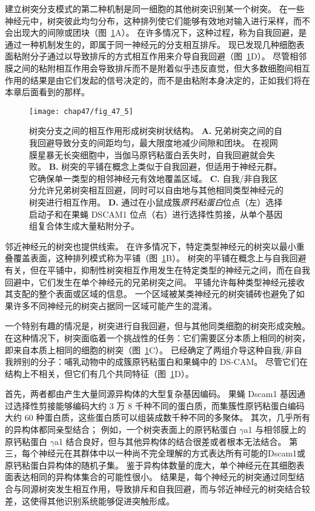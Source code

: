 建立树突分支模式的第二种机制是同一细胞的其他树突识别某一个树突。
在一些神经元中，树突彼此均匀分布，这种排列使它们能够有效地对输入进行采样，而不会出现大的间隙或团块（图~\ref{fig:47_5}A）。
在许多情况下，这种过程，称为自我回避，是通过一种机制发生的，即属于同一神经元的分支相互排斥。
现已发现几种细胞表面粘附分子通过以导致排斥的方式相互作用来介导自我回避（图~\ref{fig:47_5}D）。
尽管相邻膜之间的粘附相互作用会导致排斥而不是附着似乎违反直觉，但大多数细胞间相互作用的结果是由它们发起的信号决定的，而不是由粘附本身决定的，正如我们将在本章后面看到的那样。


\begin{figure}[htbp]
	\centering
	\texttt{[image: chap47/fig\_47\_5]}
	\caption{树突分支之间的相互作用形成树突树状结构。
		\textbf{A.} 兄弟树突之间的自我回避导致分支的间距均匀，最大限度地减少间隙和团块。
		在视网膜星暴无长突细胞中，当伽马原钙粘蛋白丢失时，自我回避就会失败。
		\textbf{B.} 树突的平铺在概念上类似于自我回避，但适用于神经元群。
		它确保单一类型的相邻神经元有效地覆盖区域。
		\textbf{C.} 自我/非自我区分允许兄弟树突相互回避，同时可以自由地与其他相同类型神经元的树突进行相互作用。
		\textbf{D.} 通过在小鼠成簇\textit{原钙粘蛋白}位点（左）选择启动子和在果蝇 DSCAM1 位点（右）进行选择性剪接，从单个基因组复合体生成大量粘附分子。}
	\label{fig:47_5}
\end{figure}


邻近神经元的树突也提供线索。
在许多情况下，特定类型神经元的树突以最小重叠覆盖表面，这种排列模式称为平铺（图~\ref{fig:47_5}B）。
树突的平铺在概念上与自我回避有关，但在平铺中，抑制性树突相互作用发生在特定类型的神经元之间，而在自我回避中，它们发生在单个神经元的兄弟树突之间。
平铺允许每种类型神经元接收其支配的整个表面或区域的信息。
一个区域被某类神经元的树突铺砖也避免了如果许多不同神经元的树突占据同一区域可能产生的混淆。


一个特别有趣的情况是，树突进行自我回避，但与其他同类细胞的树突形成突触。
在这种情况下，树突面临着一个挑战性的任务：它们需要区分本质上相同的树突，即来自本质上相同的细胞的树突（图~\ref{fig:47_5}C）。
已经确定了两组介导这种自我/非自我辨别的分子：哺乳动物中的成簇原钙粘蛋白和果蝇中的 DS-CAM。
尽管它们在结构上不相关，但它们有几个共同特征（图~\ref{fig:47_5}D）。


首先，两者都由产生大量同源异构体的大型复杂基因编码。
果蝇 Dscam1 基因通过选择性剪接能够编码大约 3 万 8 千种不同的蛋白质，而集簇性原钙粘蛋白编码大约 60 种蛋白质，这些蛋白质可以组装成数千种不同的多聚体。
其次，几乎所有的异构体都同亲型结合；
例如，一个树突表面上的原钙粘蛋白 $\gamma$a1 与相邻膜上的原钙粘蛋白 $\gamma$a1 结合良好，但与其他异构体的结合很差或者根本无法结合。
第三，每个神经元在其群体中以一种尚不完全理解的方式表达所有可能的Dscam1或原钙粘蛋白异构体的随机子集。
鉴于异构体数量的庞大，单个神经元在其细胞表面表达相同的异构体集合的可能性很小。
结果是，每个神经元的树突通过同型结合与同源树突发生相互作用，导致排斥和自我回避，而与邻近神经元的树突结合较差，这使得其他识别系统能够促进突触形成。


